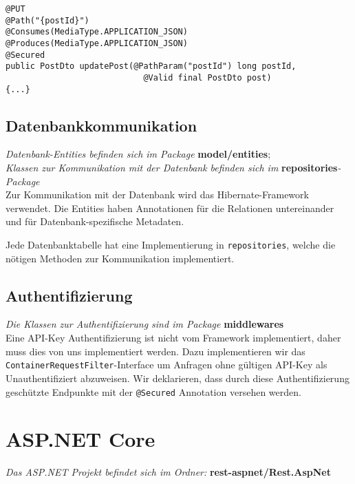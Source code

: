 \begin{lstlisting}[style=Java, caption={PUT /posts/\{id\} - Deklaration}]
@PUT
@Path("{postId}")
@Consumes(MediaType.APPLICATION_JSON)
@Produces(MediaType.APPLICATION_JSON)
@Secured
public PostDto updatePost(@PathParam("postId") long postId,
                            @Valid final PostDto post)
{...}
\end{lstlisting}

\subsection{Datenbankkommunikation}

\textit{Datenbank-Entities befinden sich im Package} \textbf{model/entities}; \\
\textit{Klassen zur Kommunikation mit der Datenbank befinden sich im} \textbf{repositories}\textit{-Package} \\

Zur Kommunikation mit der Datenbank wird das Hibernate-Framework verwendet.
Die Entities haben Annotationen für die Relationen untereinander und für Datenbank-spezifische Metadaten.

Jede Datenbanktabelle hat eine Implementierung in \texttt{repositories}, welche die nötigen Methoden zur Kommunikation implementiert.

\subsection{Authentifizierung}

\textit{Die Klassen zur Authentifizierung sind im Package} \textbf{middlewares}\\

Eine API-Key Authentifizierung ist nicht vom Framework implementiert, daher muss dies von uns implementiert werden.
Dazu implementieren wir das \texttt{ContainerRequestFilter}-Interface um Anfragen ohne gültigen API-Key als Unauthentifiziert abzuweisen.
Wir deklarieren, dass durch diese Authentifizierung geschützte Endpunkte mit der \texttt{@Secured} Annotation versehen werden.



\section{ASP.NET Core}
\label{sec:implementation-aspnetcore}
\textit{Das ASP.NET Projekt befindet sich im Ordner:} \textbf{rest-aspnet/Rest.AspNet}\\

